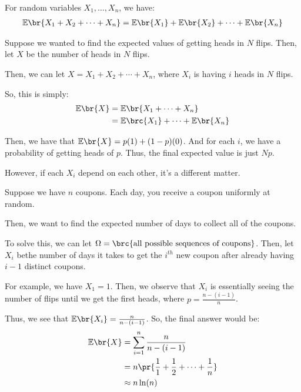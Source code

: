 \documentclass[openany]{book}
\begin{document}
\begin{thm}
	For random variables $X_1, \ldots, X_n$, we have:
	\begin{align*}
		\mathbb E\br{X_1 + X_2 + \cdots + X_n} = \mathbb E\br{X_1} + \mathbb E\br{X_2} + \cdots + \mathbb E\br{X_n}
	\end{align*}
\end{thm}
\begin{example}
	Suppose we wanted to find the expected values of getting heads in $N$ flips. Then, let $X$ be the number of heads in $N$ flips.
	
	Then, we can let $X = X_1 + X_2 + \cdots + X_n$, where $X_i$ is having $i$ heads in $N$ flips.
	
	So, this is simply:
	\begin{align*}
		\mathbb E\br{X} &= \mathbb E\br{X_1 + \cdots + X_n} \\
		&= \mathbb E\brc{X_1} + \cdots + \mathbb E\br{X_n} 
	\end{align*}
	
	Then, we have that $\mathbb{E}\br{X} = p(1) + (1-p)(0)$. And for each $i$, we have a probability of getting heads of $p$. Thus, the final expected value is just $Np$.
\end{example}

However, if each $X_i$ depend on each other, it's a different matter.
\begin{example}
	Suppose we have $n$ coupons. Each day, you receive a coupon uniformly at random.
	
	Then, we want to find the expected number of days to collect all of the coupons.
	
	To solve this, we can let $\Omega = \brc{\text{all possible sequences of coupons}}$. Then, let $X_i$ bethe number of days it takes to get the $i^{th}$ new coupon after already having $i-1$ distinct coupons.
	
	For example, we have $X_1 = 1$. Then, we observe that $X_i$ is essentially seeing the number of flips until we get the first heads, where $p = \frac{n-(i-1)}{n}$.
	
	Thus, we see that $\mathbb E\br{X_i} = \frac{n}{n-(i-1)}$. So, the final answer would be:
	\begin{align*}
		\mathbb E\br{X} &= \sum_{i=1}^{n} \frac{n}{n-(i-1)} \\
		&= n\pr{\frac{1}{1} + \frac{1}{2} + \cdots + \frac{1}{n}} \\
		&\approx n\ln(n)
	\end{align*}
\end{example}
\end{document}
